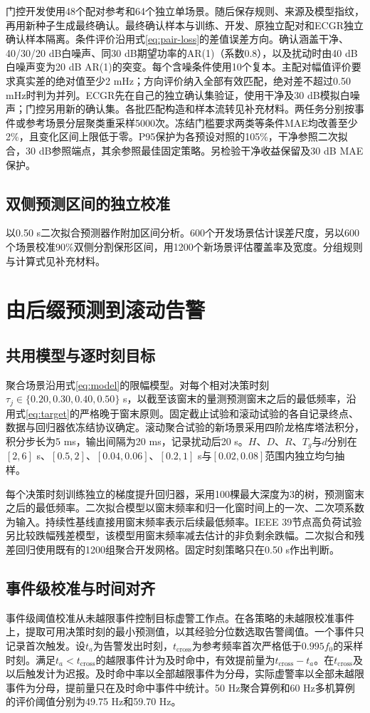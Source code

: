 \documentclass[UTF8,a4paper,11pt]{ctexart}
\begin{document}
门控开发使用48个配对参考和64个独立单场景。随后保存规则、来源及模型指纹，再用新种子生成最终确认。最终确认样本与训练、开发、原独立配对和ECGR独立确认样本隔离。条件评价沿用式\eqref{eq:pair-loss}的差值误差方向。确认涵盖干净、40/30/20 dB白噪声、同30 dB期望功率的AR(1)（系数0.8），以及扰动时由40 dB白噪声变为20 dB AR(1)的突变。每个含噪条件使用10个复本。主配对幅值评价要求真实差的绝对值至少2 mHz；方向评价纳入全部有效匹配，绝对差不超过0.50 mHz时判为并列。ECGR先在自己的独立确认集验证，使用干净及30 dB模拟白噪声；门控另用新的确认集。各批匹配构造和样本流转见补充材料。两任务分别按事件或参考场景分层聚类重采样5000次。冻结门槛要求两类等条件MAE均改善至少2\%，且变化区间上限低于零。P95保护为各预设对照的105\%，干净参照二次拟合，30 dB参照端点，其余参照最佳固定策略。另检验干净收益保留及30 dB MAE保护。

\subsection{双侧预测区间的独立校准}
以0.50 s二次拟合预测器作附加区间分析。600个开发场景估计误差尺度，另以600个场景校准90\%双侧分割保形区间\cite{angelopoulos2023}，用1200个新场景评估覆盖率及宽度。分组规则与计算式见补充材料。

\section{由后缀预测到滚动告警}\label{sec:rolling-method}
\subsection{共用模型与逐时刻目标}
聚合场景沿用式\eqref{eq:model}的限幅模型。对每个相对决策时刻 $\tau_j\in\{0.20,0.30,0.40,0.50\}$ s，以截至该窗末的量测预测窗末之后的最低频率，沿用式\eqref{eq:target}的严格晚于窗末原则。固定截止试验和滚动试验的各自记录终点、数据与回归器依冻结协议确定。滚动聚合试验的新场景采用四阶龙格库塔法积分，积分步长为5 ms，输出间隔为20 ms，记录扰动后20 s。$H$、$D$、$R$、$T_g$与$d$分别在$[2,6]$ s、$[0.5,2]$、$[0.04,0.06]$、$[0.2,1]$ s与$[0.02,0.08]$范围内独立均匀抽样。

每个决策时刻训练独立的梯度提升回归器，采用100棵最大深度为3的树，预测窗末之后的最低频率。二次拟合模型以窗末频率和归一化窗时间上的一次、二次项系数为输入。持续性基线直接用窗末频率表示后续最低频率。IEEE 39节点高负荷试验另比较跌幅残差模型，该模型用窗末频率减去估计的非负剩余跌幅。二次拟合和残差回归使用既有的1200组聚合开发网格。固定时刻策略只在0.50 s作出判断。

\subsection{事件级校准与时间对齐}
事件级阈值校准从未越限事件控制目标虚警工作点\cite{rigollet}。在各策略的未越限校准事件上，提取可用决策时刻的最小预测值，以其经验分位数选取告警阈值。一个事件只记录首次触发。设$t_a$为告警发出时刻，$t_{\mathrm{cross}}$为参考频率首次严格低于$0.995f_0$的采样时刻。满足$t_a<t_{\mathrm{cross}}$的越限事件计为及时命中，有效提前量为$t_{\mathrm{cross}}-t_a$。在$t_{\mathrm{cross}}$及以后触发计为迟报。及时命中率以全部越限事件为分母，实际虚警率以全部未越限事件为分母，提前量只在及时命中事件中统计。50 Hz聚合算例和60 Hz多机算例的评价阈值分别为49.75 Hz和59.70 Hz。
\end{document}

